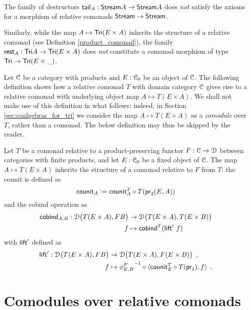 \documentclass[a4paper,USenglish]{lipics}
\begin{document}
\begin{rem}
 The family of destructors $\stail_A : \stream A \to \stream A$  
 does \emph{not} satisfy the axioms for a morphism of relative comonads $\stream\to\stream$.
 
 Similarly, while the map $A \mapsto \Tri(E\times A)$ inherits the structure of a relative comonad (see Definition \ref{product_comonad}),
 the family $\tail_A : \Tri A \to \Tri(E \times A)$  does \emph{not} constitute a comonad morphism
 of type $\Tri \to \Tri(E \times \_)$.
\end{rem}

Let $\C$ be a category with products and $E:\C_0$ be an object of $\C$.
The following definition shows how a relative comonad $T$ with domain category $\C$ gives rise to a relative comonad with underlying object map
$A \mapsto T(E\times A)$.
We shall not make use of this definition in what follows: indeed, in Section \ref{sec:coalgebras_for_tri} we consider the map $A\mapsto T(E\times A)$
as a \emph{comodule} over $T$, rather than a comonad. The below definition may thus be skipped by the reader.

\begin{definition}\label{product_comonad}
  Let $T$ be a comonad relative to a product-preserving functor $F:\C\to\D$ between categories with finite products,
  and let $E:\C_0$ be a fixed object of $\C$.
 The map $A\mapsto T(E\times A)$ inherits the structure of a comonad relative to $F$ from $T$: the 
 counit is defined as
   \[ \counit_A := \comp{T(\pr_2(E,A))}{\counit^T_{A}} \]
  and the cobind operation as
   \begin{align*} 
            \cobind_{A,B} : \D\bigl(T(E\times A),FB\bigr) &\to \D\bigl(T(E\times A),T(E\times B)\bigr) \\
              f &\mapsto  \cobind^T(\extend'~f)
   \end{align*}
  with $\extend'$ defined as 
  \begin{align*} \extend' : \D\bigl(T(E\times A),FB\bigr) &\to \D\bigl(T(E\times A), F(E\times B)\bigr) \enspace , \\ 
                                            f & \mapsto \comp{\langle \comp{T(\pr_1)}{\counit^T_E}, f \rangle}{{\phi^{F}_{E,B}}^{-1}} \enspace .
  \end{align*}
\end{definition}




\section{Comodules over relative comonads}\label{sec:comodules}
\end{document}
